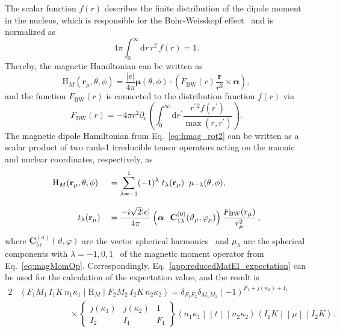 The scalar function $f(r)$ describes the finite distribution of the dipole moment in the nucleus, which is responsible for the Bohr-Weisskopf effect~\cite{bohrWeisskopf1950} and is normalized as
\begin{equation}
4\pi\int_0^\infty \text{d}r\,r^2\,f(r)=1.
\end{equation}
Thereby, the magnetic Hamiltonian can be written as
\begin{equation}
\label{eq:hmag_rot2}
\text{H}_M(\mathbf{r}_\mu,\theta,\phi) =\frac{|e|}{4\pi}\boldsymbol{\mu}(\theta,\phi)\cdot
\left( F_{\text{BW}}(r)\frac{\mathbf{r}}{r^3}\times \boldsymbol{\alpha}\right),
\end{equation}
and the function $F_{\text{BW}}(r)$ is connected to the distribution function $f(r)$ via
\begin{equation}
F_{\text{BW}}(r)=-4\pi r^2\partial_r \left(\int_0^\infty\text{d}r^\prime \frac{r^{\prime\,2}f(r^\prime)}{\max (r,r^\prime)}\right).
\end{equation}
The magnetic dipole Hamiltonian from Eq.~\eqref{eq:hmag_rot2} can be written as a scalar product of two rank-1 irreducible tensor operators acting on the muonic and nuclear coordinates, respectively, as~\cite{johnson2007}
\begin{alignat}{2}
&\text{H}_M  (\mathbf{r}_\mu,\theta,\phi) &&=\sum_{\lambda=-1}^1 (-1)^\lambda \;t_\lambda(\mathbf{r}_\mu) \;\;\mu_{-\lambda}(\theta,\phi),\notag\\[7.5pt]
&\qquad \quad t_\lambda(\mathbf{r}_\mu) &&= \frac{-i\sqrt{2}|e|}{4\pi}\left(\boldsymbol{\alpha}\cdot\mathbf{C}^{(0)}_{1\lambda}(\vartheta_\mu,\varphi_\mu)\right)\frac{F_{\text{BW}}(r_\mu)}{r_\mu^2}\,\notag,
\end{alignat}
where $\mathbf{C}^{(a)}_{b\,c}(\vartheta,\varphi)$ are the vector spherical harmonics~\cite[Section 7.]{varshalovich1988} and $\mu_\lambda$ are the spherical components with $\lambda = -1,0,1 $~\cite[Section 1.]{varshalovich1988} of the magnetic moment operator from Eq.~\eqref{eq:magMomOp}. Correspondingly, Eq.~\eqref{app:reducedMatEl_expectation} can be used for the calculation of the expectation value, and the result is
\begin{alignat}{2}
& \left<F_1M_1\,I_1K\,n_1\kappa_1 \middle|\text{H}_M \middle|F_2M_2\,I_2K\,n_2\kappa_2 \right> = \delta_{F_1F_2}\delta_{M_1M_2}(-1)^{F_1+j(\kappa_2)+I_1}\\[7.5pt]
&\qquad\qquad\qquad\times
\begin{Bmatrix}
j(\kappa_1)&j(\kappa_2)&1\\
I_2&I_1&F_1
\end{Bmatrix}
\left< n_1\kappa_1\middle|\middle|t \middle|\middle| n_2\kappa_2\right>
\left< I_1K\middle|\middle|\mu \middle|\middle|I_2K\right>.
\end{alignat}
